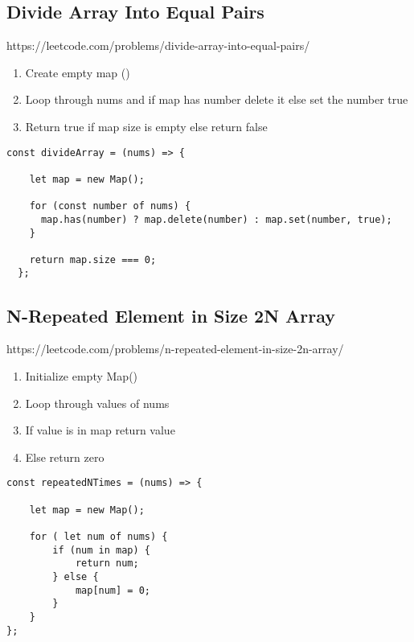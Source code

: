 \documentclass[10pt]{article}
\begin{document}
\pagebreak %
\medskip   
\subsection{Divide Array Into Equal Pairs}
https://leetcode.com/problems/divide-array-into-equal-pairs/

\begin{enumerate}
	\item Create empty map ()
	\item Loop through nums and if map has number delete it else set the number true
	\item Return true if map size is empty else return false
\end{enumerate}

\begin{lstlisting}[title=Solution divideArray, captionpos=t]
const divideArray = (nums) => {
    
    let map = new Map();
      
    for (const number of nums) {
      map.has(number) ? map.delete(number) : map.set(number, true);
    }
      
    return map.size === 0;
  };
\end{lstlisting}

\medskip %




\pagebreak %
\medskip   
\subsection{N-Repeated Element in Size 2N Array}
https://leetcode.com/problems/n-repeated-element-in-size-2n-array/

\begin{enumerate}
	\item Initialize empty Map()
	\item Loop through values of nums
	\item If value is in map return value
	\item Else return zero 
\end{enumerate}

\begin{lstlisting}[title=Solution repeatedNTimes with Map(), captionpos=t]
const repeatedNTimes = (nums) => {
    
    let map = new Map();
    
    for ( let num of nums) {
        if (num in map) {
            return num;
        } else {
            map[num] = 0;
        }
    }
};
\end{lstlisting}
\end{document}
